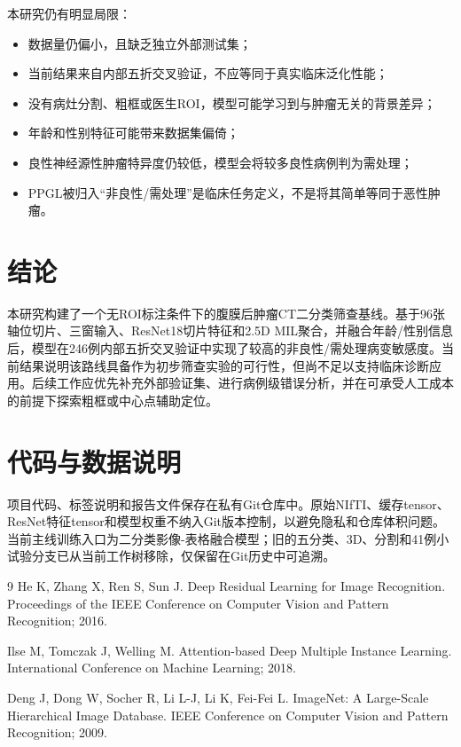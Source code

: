 \documentclass[UTF8,a4paper,11pt]{ctexart}
\begin{document}
本研究仍有明显局限：

\begin{itemize}
  \item 数据量仍偏小，且缺乏独立外部测试集；
  \item 当前结果来自内部五折交叉验证，不应等同于真实临床泛化性能；
  \item 没有病灶分割、粗框或医生ROI，模型可能学习到与肿瘤无关的背景差异；
  \item 年龄和性别特征可能带来数据集偏倚；
  \item 良性神经源性肿瘤特异度仍较低，模型会将较多良性病例判为需处理；
  \item PPGL被归入“非良性/需处理”是临床任务定义，不是将其简单等同于恶性肿瘤。
\end{itemize}

\section{结论}

本研究构建了一个无ROI标注条件下的腹膜后肿瘤CT二分类筛查基线。基于96张轴位切片、三窗输入、ResNet18切片特征和2.5D MIL聚合，并融合年龄/性别信息后，模型在246例内部五折交叉验证中实现了较高的非良性/需处理病变敏感度。当前结果说明该路线具备作为初步筛查实验的可行性，但尚不足以支持临床诊断应用。后续工作应优先补充外部验证集、进行病例级错误分析，并在可承受人工成本的前提下探索粗框或中心点辅助定位。

\section*{代码与数据说明}

项目代码、标签说明和报告文件保存在私有Git仓库中。原始NIfTI、缓存tensor、ResNet特征tensor和模型权重不纳入Git版本控制，以避免隐私和仓库体积问题。当前主线训练入口为二分类影像-表格融合模型；旧的五分类、3D、分割和41例小试验分支已从当前工作树移除，仅保留在Git历史中可追溯。

\begin{thebibliography}{9}
  He K, Zhang X, Ren S, Sun J. Deep Residual Learning for Image Recognition. Proceedings of the IEEE Conference on Computer Vision and Pattern Recognition; 2016.

  Ilse M, Tomczak J, Welling M. Attention-based Deep Multiple Instance Learning. International Conference on Machine Learning; 2018.

  Deng J, Dong W, Socher R, Li L-J, Li K, Fei-Fei L. ImageNet: A Large-Scale Hierarchical Image Database. IEEE Conference on Computer Vision and Pattern Recognition; 2009.
\end{thebibliography}
\end{document}
